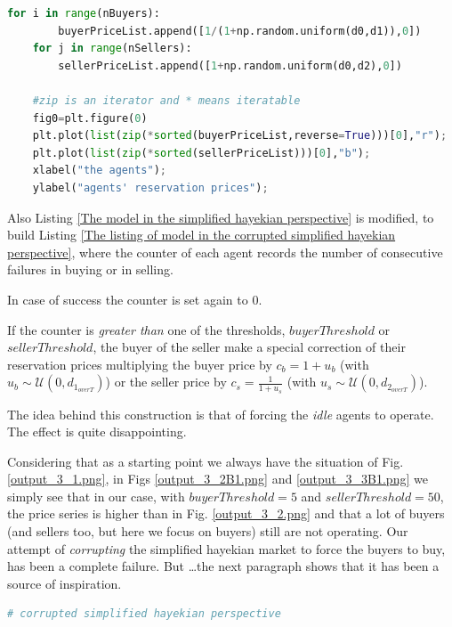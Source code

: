 \documentclass[10pt]{report}
\begin{document}
\begin{appendices}
\begin{lstlisting}[language=Python, caption=Warming up for the corrupted version of the model, 
label={Warming up for the corrupted version},basicstyle=\ttfamily\footnotesize]
    for i in range(nBuyers):
        buyerPriceList.append([1/(1+np.random.uniform(d0,d1)),0])
    for j in range(nSellers):
        sellerPriceList.append([1+np.random.uniform(d0,d2),0])
    
    #zip is an iterator and * means iteratable    
    fig0=plt.figure(0)
    plt.plot(list(zip(*sorted(buyerPriceList,reverse=True)))[0],"r");
    plt.plot(list(zip(*sorted(sellerPriceList)))[0],"b");
    xlabel("the agents");
    ylabel("agents' reservation prices");
\end{lstlisting}


Also Listing \ref{The model in the simplified hayekian perspective} is modified, to build Listing \ref{The listing of model in the corrupted simplified hayekian perspective}, where the counter of each agent records the number of consecutive failures in buying or in selling.

In case of success the counter is set again to $0$.

If the counter is \emph{greater than}  one of the thresholds, $buyerThreshold$ or $sellerThreshold$, the buyer of the seller make a special correction of their reservation prices multiplying the buyer price by $c_b=1 + u_b$ (with $u_b\sim\mathcal{U}(0,d_{1_{overT}})$) or the seller price by $c_s=\frac{1} {1 + u_s}$ (with $u_s\sim\mathcal{U}(0,d_{2_{overT}})$).

The idea behind this construction is that of forcing the \emph{idle} agents to operate. The effect is quite disappointing.

Considering that as a starting point we always have the situation of Fig. \ref{output_3_1.png}, in Figs \ref{output_3_2B1.png} and \ref{output_3_3B1.png} we simply see that in our case, with $buyerThreshold=5$ and  $sellerThreshold=50$, the price series is higher than in Fig. \ref{output_3_2.png} and that a lot of buyers (and sellers too, but here we focus on buyers) still are not operating. Our attempt of \emph{corrupting} the simplified hayekian market to force the buyers to buy, has been a complete failure. But \ldots the next paragraph shows that it has been a source of inspiration.




\begin{lstlisting}[language=Python, caption=The model in the corrupted simplified hayekian perspective, 
label={The listing of model in the corrupted simplified hayekian perspective},basicstyle=\ttfamily\footnotesize]
# corrupted simplified hayekian perspective


\end{lstlisting}
\end{appendices}
\end{document}
